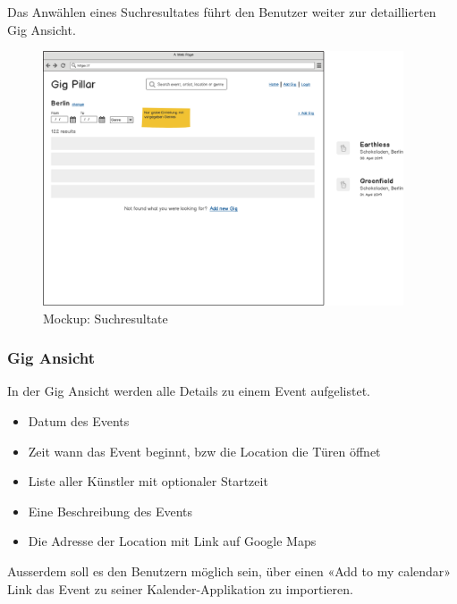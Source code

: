 \noindent
Das Anwählen eines Suchresultates führt den Benutzer weiter zur detaillierten
Gig Ansicht.

\begin{figure}[!htb]
  \centering
  \includegraphics[width=0.95\textwidth]{mockups/search-result.png}
  \caption{Mockup: Suchresultate}
\end{figure}

\clearpage
\subsubsection{Gig Ansicht}

In der Gig Ansicht werden alle Details zu einem Event aufgelistet.

\begin{itemize}
  \tightlist{}
  \item{} Datum des Events
  \item{} Zeit wann das Event beginnt, bzw die Location die Türen öffnet
  \item{} Liste aller Künstler mit optionaler Startzeit
  \item{} Eine Beschreibung des Events
  \item{} Die Adresse der Location mit Link auf Google Maps
\end{itemize}

\noindent
Ausserdem soll es den Benutzern möglich sein, über einen «Add to my calendar»
Link das Event zu seiner Kalender-Applikation zu importieren.

